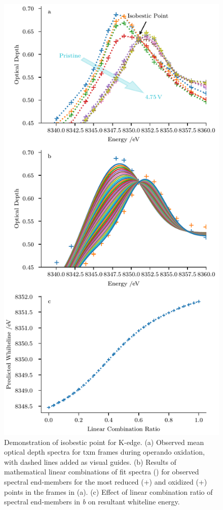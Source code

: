 \documentclass{article}
\begin{document}
\begin{figure}
  \includegraphics{figures/isobestic-point.pdf}
  \caption{Demonstration of isobestic point for \nmc[333]{} 
    K-edge. (a) Observed mean optical depth spectra for \gls{txm}
    frames during operando oxidation, with dashed lines added as
    visual guides. (b) Results of mathematical linear combinations of
    fit spectra (\mplline{}) for observed spectral end-members for the
    most reduced (\textcolor{C0}{+}) and oxidized (\textcolor{C1}{+})
    points in the \nmc[333]{} frames in (a). (c) Effect of linear
    combination ratio of spectral end-members in \emph{b} on resultant
    whiteline energy.}
  \label{fig:isobestic-point}
\end{figure}
\end{document}
